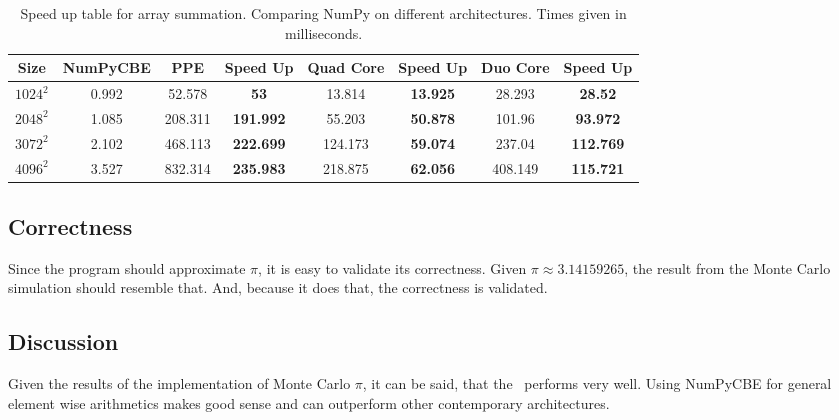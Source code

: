 \begin{table}
\begin{tabular}{|c|c|c|c|c|c|c|c|}
\hline
Size & NumPyCBE & PPE & Speed Up & Quad Core & Speed Up & Duo Core  & Speed Up \\
\hline
$1024^2$ & 0.992         & 52.578         & \bf{53}       & 13.814         & \bf{13.925}   & 28.293               & \bf{28.52}  \\
$2048^2$ & 1.085         & 208.311        & \bf{191.992}  & 55.203	   & \bf{50.878}   & 101.96               & \bf{93.972}  \\
$3072^2$ & 2.102         & 468.113        & \bf{222.699}  & 124.173        & \bf{59.074}   & 237.04               & \bf{112.769} \\
$4096^2$ & 3.527         & 832.314        & \bf{235.983}  & 218.875        & \bf{62.056}   & 408.149              & \bf{115.721} \\
\hline
\end{tabular}
\caption[Speed up table for array summation]{Speed up table for array summation. Comparing NumPy on different architectures. Times given in milliseconds.\label{tbl:sum}}
\end{table}






\subsection{Correctness}

Since the program should approximate $\pi$, it is easy to validate its
correctness. Given $\pi \approx 3.14159265$, the result from the Monte
Carlo simulation should resemble that. And, because it does that, the
correctness is validated.

\subsection{Discussion}

Given the results of the implementation of Monte Carlo $\pi$, it can
be said, that the \CBE\ performs very well. Using NumPyCBE for general
element wise arithmetics makes good sense and can outperform other
contemporary architectures.

